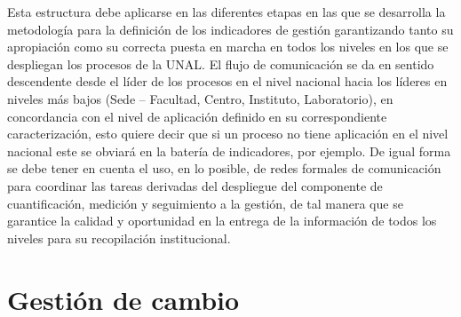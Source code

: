 \documentclass[
]{book}
\begin{document}
Esta estructura debe aplicarse en las diferentes etapas en las que se desarrolla la metodología para la definición de los indicadores de gestión garantizando tanto su apropiación como su correcta puesta en marcha en todos los niveles en los que se despliegan los procesos de la UNAL. El flujo de comunicación se da en sentido descendente desde el líder de los procesos en el nivel nacional hacia los líderes en niveles más bajos (Sede -- Facultad, Centro, Instituto, Laboratorio), en concordancia con el nivel de aplicación definido en su correspondiente caracterización, esto quiere decir que si un proceso no tiene aplicación en el nivel nacional este se obviará en la batería de indicadores, por ejemplo. De igual forma se debe tener en cuenta el uso, en lo posible, de redes formales de comunicación para coordinar las tareas derivadas del despliegue del componente de cuantificación, medición y seguimiento a la gestión, de tal manera que se garantice la calidad y oportunidad en la entrega de la información de todos los niveles para su recopilación institucional.

\hypertarget{gestiuxf3n-de-cambio}{%
\chapter{Gestión de cambio}\label{gestiuxf3n-de-cambio}}
\end{document}
